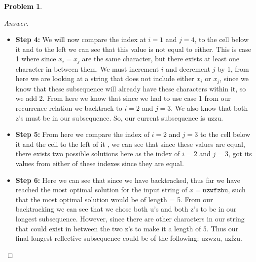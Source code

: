 \documentclass[11pt]{article}
\theoremstyle{definition}
\theoremstyle{definition}
\newtheorem{required}{Problem}
\theoremstyle{definition}
\begin{document}
\begin{required}
\begin{enumerate}[label=(\alph*)]
\begin{proof}[Answer]
\begin {itemize}
\item \textbf{Step 4:} We will now compare the index at $i = 1$ and $j = 4$, to the cell below it and to the left we can see that this value is not equal to either. This is case 1 where since $x_i=x_j$ are the same character, but there exists at least one character in between them. We must increment $i$ and decrement $j$ by 1, from here we are looking at a string that does not include either $x_i$ or $x_j$, since we know that these subsequence will already have these characters within it, so we add 2. From here we know that since we had to use case 1 from our recurrence relation we backtrack to $i = 2$ and $j = 3$. We also know that both z's must be in our subsequence. So, our current subsequence is uzzu.\\

\item \textbf{Step 5:} From here we compare the index of $i = 2$ and $j = 3$ to the cell below it and the cell to the left of it , we can see that since these values are equal, there exists two possible solutions here as the index of $i = 2$ and $j = 3$, got its values from either of these indexes since they are equal. 

\item \textbf{Step 6:} Here we can see that since we have backtracked, thus far we have reached the most optimal solution for the input string of $x = \texttt{uzwfzbu} $, such that the most optimal solution would be of length = 5. From our backtracking we can see that we chose both u's and both z's to be in our longest subsequence. However, since there are other characters in our string that could exist in between the two z's to make it a length of 5. Thus our final longest reflective subsequence could be of the following: uzwzu, uzfzu.

\end{itemize}
\end{proof}
\end{enumerate}
\end{required}

\end{document}
